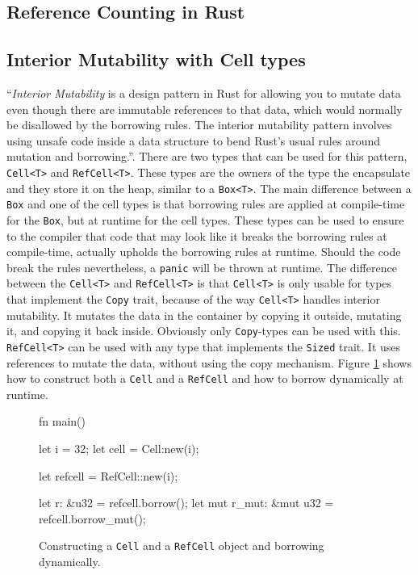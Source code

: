 \documentclass[twocolumn]{article}
\begin{document}
\subsection{Reference Counting in Rust}
\subsection{Interior Mutability with Cell types}
``\textit{Interior Mutability} is a design pattern in Rust for allowing you to mutate data even though there are immutable references to that data, which would normally be disallowed by the borrowing rules. The interior mutability pattern involves using unsafe code inside a data structure to bend Rust's usual rules around mutation and borrowing.''\cite{RustBook-InteriorMutability}.
There are two types that can be used for this pattern, \texttt{Cell<T>} and \texttt{RefCell<T>}.
These types are the owners of the type the encapsulate and they store it on the heap, similar to a \texttt{Box<T>}.
The main difference between a \texttt{Box} and one of the cell types is that borrowing rules are applied at compile-time for the \texttt{Box}, but at runtime for the cell types.
These types can be used to ensure to the compiler that code that may look like it breaks the borrowing rules at compile-time, actually upholds the borrowing rules at runtime.
Should the code break the rules nevertheless, a \texttt{panic} will be thrown at runtime.
The difference between the \texttt{Cell<T>} and \texttt{RefCell<T>} is that \texttt{Cell<T>} is only usable for types that implement the \texttt{Copy} trait, because of the way \texttt{Cell<T>} handles interior mutability.
It mutates the data in the container by copying it outside, mutating it, and copying it back inside.
Obviously only \texttt{Copy}-types can be used with this.
\texttt{RefCell<T>} can be used with any type that implements the \texttt{Sized} trait.
It uses references to mutate the data, without using the copy mechanism.
Figure \ref{mutability-refcell} shows how to construct both a \texttt{Cell} and a \texttt{RefCell} and how to borrow dynamically at runtime.
\begin{figure}
\begin{rustcode}
fn main() {
    let i = 32;
    let cell = Cell:new(i);
    
    let refcell = RefCell::new(i);

    let r: &u32 = refcell.borrow();
    let mut r_mut: &mut u32 
        = refcell.borrow_mut();
}
\end{rustcode}
\vspace{-2em}
\caption{Constructing a \texttt{Cell} and a \texttt{RefCell} object and borrowing dynamically.}
\label{mutability-refcell}
\end{figure}
\end{document}
